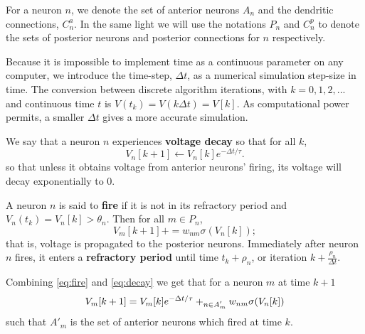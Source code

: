 

For a neuron $n$, we denote the set of anterior neurons $A_n$ and the dendritic connections, $C_{n}^a$. In the same light we will use the notations $P_n$ and $C_n^p$ to denote the sets of posterior neurons and posterior connections for $n$ respectively.

Because it is impossible to implement time as a continuous parameter on any computer, we introduce the time-step, $\Delta t$, as a numerical simulation step-size in time. The conversion between discrete algorithm iterations, with $k = 0, 1, 2, ...$ and continuous time $t$ is $V(t_{k}) = V(k\Delta t) = V[k]$. As computational power permits, a smaller $\Delta t$ gives a more accurate simulation.

\begin{definition}\label{decay}
	We say that a neuron $n$ experiences \textbf{voltage decay} so that for all $k$,
	\begin{equation}
		V_n[k+1] \leftarrow V_n[k]e^{-\Delta t/\tau}. \label{eq:decay}
	\end{equation}
	so that unless it obtains voltage from anterior neurons' firing, its voltage will decay exponentially to 0.
\end{definition}


\begin{definition}\label{fire}
	A neuron $n$ is said to \textbf{fire} if it is not in its refractory period and $V_n(t_{k}) = V_n[k] > \theta_n$. Then for all $m \in P_n$,
	\begin{equation}
		V_m[k+1] += w_{nm} \sigma(V_n[k]); \label{eq:fire}
	\end{equation}
	that is, voltage is propagated to the posterior neurons. 	Immediately after neuron $n$ fires, it enters  a \textbf{refractory period} until time $t_{k} + \rho_n$, or iteration $k + \frac{\rho_n}{\Delta t}$.
\end{definition}


Combining \eqref{eq:fire} and \eqref{eq:decay} we get that for a neuron $m$ at time $k+1$
\begin{equation}
	V_m[k+1] = V_m[k]e^{-\Delta  t/\tau} + \relax_{\substack{n \in A'_m}} w_{nm} \sigma(V_n[k])
\end{equation}
such that $A'_m$ is the set of anterior neurons which fired at time $k.$
